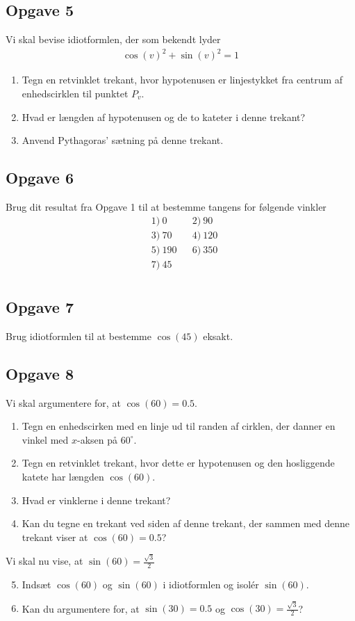 \subsection*{Opgave 5}
Vi skal bevise idiotformlen, der som bekendt lyder
\begin{align*}
	\cos(v)^2 + \sin(v)^2 = 1
\end{align*}
\begin{enumerate}[label=\roman*)]
	\item Tegn en retvinklet trekant, hvor hypotenusen er linjestykket fra centrum af enhedscirklen til 
	punktet $P_v$. 
	\item Hvad er længden af hypotenusen og de to kateter i denne trekant?
	\item Anvend Pythagoras' sætning på denne trekant.
\end{enumerate}

\subsection*{Opgave 6}
Brug dit resultat fra Opgave 1 til at bestemme tangens for følgende vinkler
\begin{align*}
&1) \ 0  &&2) \ 90   \\
&3) \ 70   &&4) \ 120  \\
&5) \ 190 &&6) \ 350   \\
&7) \ 45     \\
\end{align*}


\subsection*{Opgave 7}
Brug idiotformlen til at bestemme $\cos(45)$ eksakt.

\subsection*{Opgave 8}
Vi skal argumentere for, at $\cos(60) = 0.5$. 
\begin{enumerate}[label=\roman*)]
	\item Tegn en enhedscirken med en linje ud til randen af cirklen,
	 der danner en vinkel med $x$-aksen på $60^\circ$.
	\item Tegn en retvinklet trekant, hvor dette er hypotenusen og
	 den hosliggende katete har længden $\cos(60)$.
	\item Hvad er vinklerne i denne trekant?
	\item Kan du tegne en trekant ved siden af denne trekant, der sammen med denne trekant
	 viser at $\cos(60) = 0.5$?
\end{enumerate}
Vi skal nu vise, at $\sin(60) = \frac{\sqrt{3}}{2}$
\begin{enumerate}[label=\roman*)]
	\setcounter{enumi}{4}
\item Indsæt $\cos(60)$ og $\sin(60)$ i idiotformlen og isolér $\sin(60)$. 
\item Kan du argumentere for, at $\sin(30) = 0.5$ og $\cos(30) = \frac{\sqrt{3}}{2}$?
\end{enumerate}


